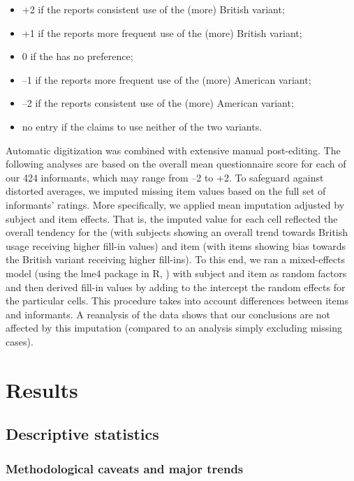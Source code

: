 \documentclass[output=paper]{langsci/langscibook}
\begin{document}
\begin{itemize}
\item +2 if the  reports consistent use of the (more) British variant;
\item +1 if the  reports more frequent use of the (more) British variant;
\item 0 if the  has no preference;
\item --1 if the  reports more frequent use of the (more) American variant;
\item --2 if the  reports consistent use of the (more) American variant;
\item no entry if the  claims to use neither of the two variants.
\end{itemize}

Automatic digitization was combined with extensive manual post-editing. The following analyses are based on the overall mean questionnaire score for each of our 424 informants, which may range from --2 to +2. To safeguard against distorted averages, we imputed missing item values based on the full set of informants’ ratings. More specifically, we applied mean imputation adjusted by subject and item effects. That is, the imputed value for each cell reflected the overall tendency for the  (with subjects showing an overall trend towards British usage receiving higher fill-in values) and item (with items showing bias towards the British variant receiving higher fill-ins). To this end, we ran a mixed-effects model (using the lme4 package in R, \citealt{BatesEtAl2015}) with subject and item as random factors and then derived fill-in values by adding to the intercept the random effects for the particular cells. This procedure takes into account differences between items and informants. A reanalysis of the data shows that our conclusions are not affected by this imputation (compared to an analysis simply excluding missing cases). 

\section{Results}
\subsection{Descriptive statistics}
\subsubsection{Methodological caveats and major trends}
\end{document}
